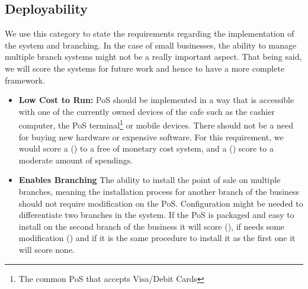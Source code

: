 \subsection{Deployability} We use this category to state the requirements regarding the implementation of the system and branching. In the case of small businesses, the ability to manage multiple branch systems might not be a really important aspect. That being said, we will score the systems for future work and hence to have a more complete framework.
\begin{itemize}

\item \textbf{Low Cost to Run: }PoS should be implemented in a way that is accessible with one of the currently owned devices of the cafe such as the cashier computer, the PoS terminal\footnote{The common PoS that accepts Visa/Debit Cards} or mobile devices. There should not be a need for buying new hardware or expensive software. For this requirement, we would score a (\full) to a free of monetary cost system, and a (\prt) score to a moderate amount of spendings.

\item \textbf{Enables Branching} The ability to install the point of sale on multiple branches, meaning the installation process for another branch of the business should not require modification on the PoS. Configuration might be needed to differentiate two branches in the system. If the PoS is packaged and easy to install on the second branch of the business it will score (\full), if needs some modification (\prt) and if it is the same procedure to install it as the first one it will score none.

\end{itemize}
 

